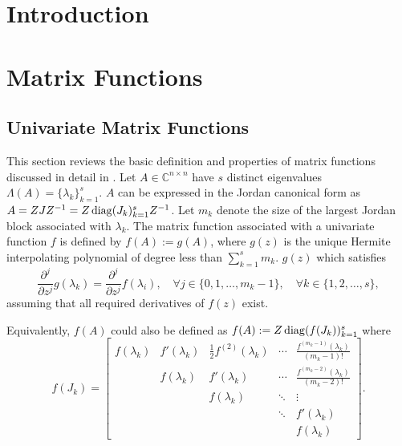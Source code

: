 \section{Introduction}


\newpage
\section{Matrix Functions}

\subsection{Univariate Matrix Functions}
This section reviews the basic definition and properties of matrix functions
discussed in detail in \cite{higham2008functions}.
Let $A \in \mathbb{C}^{n \times n}$ have $s$ distinct eigenvalues $\Lambda(A) = \{\lambda_k\}_{k=1}^{s}$.
$A$ can be expressed in the Jordan canonical form as $A = ZJZ^{-1} = Z \operatorname{diag}(J_k)_{k=1}^{s}
Z^{-1}$. Let $m_k$ denote the size of the largest Jordan block associated
with $\lambda_k$. The matrix function associated with a univariate function $f$
is defined by $f(A) := g(A)$, where $g(z)$ is the unique Hermite interpolating
polynomial of degree less than $\sum_{k=1}^{s}{m_k}$. $g(z)$ which
satisfies
\begin{equation}
    \frac{\partial^j}{\partial z^j}g(\lambda_k) = \frac{\partial^j}{\partial z^j}f(\lambda_i),
    \quad \forall j \in \{0, 1, \dots, m_k-1\},
    \quad \forall k \in \{1, 2, \dots, s\},
\end{equation}
assuming that all required derivatives of $f(z)$ exist.

Equivalently, $f(A)$ could also be defined as $f(A) := Z \operatorname{diag}(f(J_k))_{k=1}^{s}$ where
\begin{equation*}
    f(J_k) =
    \begin{bmatrix}
    f(\lambda_k) & f'(\lambda_k)  & \frac{1}{2} f^{(2)}(\lambda_k) & \cdots & \frac{f^{(m_k-1)}(\lambda_k)}{(m_k - 1)!}\\
    & f(\lambda_k) & f'(\lambda_k) & \cdots & \frac{f^{(m_k-2)}(\lambda_k)}{(m_k - 2)!} \\
    &  & f(\lambda_k) & \ddots & \vdots \\
    &  &  & \ddots & f'(\lambda_k)\\
    &  &  &  & f(\lambda_k)
    \end{bmatrix}.
\end{equation*}

